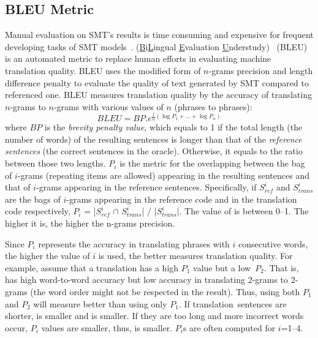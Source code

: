 \subsection{BLEU Metric}

Manual evaluation on SMT's results is time consuming and expensive for
frequent developing tasks of SMT models~\cite{Papineni2002}.
%
(\underline{B}i\underline{L}ingual \underline{E}valuation
\underline{U}nderstudy)~\cite{Papineni2002} (BLEU) is an automated
metric to replace human efforts in evaluating machine translation
quality.
BLEU uses the modified form of $n$-grams precision and length
difference penalty to evaluate the quality of text generated by SMT
compared to referenced one.
%
BLEU measures translation quality by the accuracy of translating
$n$-grams to $n$-grams with various values of $n$ (phrases to
phrases):
\[BLEU = BP.{e^{\frac{1}{n}(\log {P_1} + ... + \log {P_n})}}\]
where $BP$ is the {\em brevity penalty value}, which equals to 1 if
the total length (\ie the number of words) of the resulting sentences
is longer than that of the {\em reference sentences} (\ie the correct
sentences in the oracle). Otherwise, it equals to the ratio between
those two lengths. $P_i$ is the metric for the overlapping between
the bag of $i$-grams (repeating items are allowed) appearing in the
resulting sentences and that of $i$-grams appearing in the reference
sentences. Specifically, if $S^{i}_{ref}$ and $S^{i}_{trans}$ are the
bags of $i$-grams appearing in the reference code and in the
translation code respectively, $P_i$ = |$S^{i}_{ref}$ $\cap$
$S^{i}_{trans}$| / |$S^{i}_{trans}$|. The value of  is
between 0--1. The higher it is, the higher the n-grams precision.

Since $P_i$ represents the accuracy in translating phrases
with $i$ consecutive words, the higher the value of $i$ is used, the
better  measures translation quality. For example, assume
that a translation  has a high $P_1$ value but a
low~$P_2$. That is,  has high word-to-word accuracy but low
accuracy in translating 2-grams to 2-grams (\eg the word order might
not be respected in the result). Thus, using both $P_1$ and $P_2$ will
measure  better than using only $P_1$. If
translation~sen\-tences are shorter,  is smaller and
 is smaller. If they are too long and more incorrect words
occur, $P_i$ values are smaller, thus,  is smaller. $P_i$s
are often computed for $i$=1--4.
